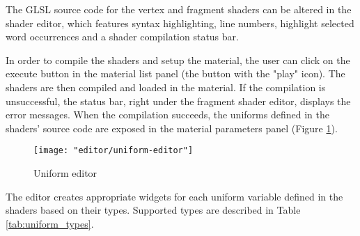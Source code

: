 The GLSL source code for the vertex and fragment shaders can be altered in the shader editor, which features syntax highlighting, line numbers, highlight selected word occurrences and a shader compilation status bar.

In order to compile the shaders and setup the material, the user can click on the execute button in the material list panel (the button with the "play" icon). The shaders are then compiled and loaded in the material. If the compilation is unsuccessful, the status bar, right under the fragment shader editor, displays the error messages. When the compilation succeeds, the uniforms defined in the shaders' source code are exposed in the material parameters panel (Figure \ref{fig:uniform-editor}).

\begin{figure}
    \caption{Uniform editor}
    \begin{center}
        \texttt{[image: "editor/uniform-editor"]}
    \end{center}
    \label{fig:uniform-editor}
\end{figure}

The editor creates appropriate widgets for each uniform variable defined in the shaders based on their types. Supported types are described in Table \ref{tab:uniform_types}.

